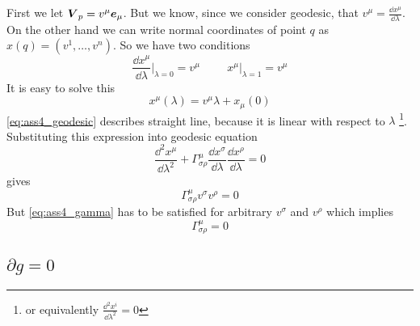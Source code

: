First we let $\boldsymbol{V}_p=v^\mu \boldsymbol{e}_\mu$. But we know, since we consider
geodesic, that $v^\mu = \frac{\dd x^\mu}{\dd \lambda}$.  On the other hand we
can write normal coordinates of point $q$ as $x(q)=(v^1,\dots,v^n)$. So we have
two conditions
%
\begin{equation}
    \frac{\dd x^\mu}{\dd \lambda} \Big|_{\lambda=0} = v^\mu
    \hspace{1cm}
    x^\mu  \Big|_{\lambda=1}= v^\mu
\end{equation}
%
It is easy to solve this
%
\begin{equation}
    x^\mu\left(\lambda\right) = v^\mu \lambda + x_\mu\left(0\right)
    \label{eq:ass4_geodesic}
\end{equation}
%
\autoref{eq:ass4_geodesic} describes straight line, because it is linear with
respect to $\lambda$ \footnote{or equivalently $\frac{\dd^2 x^i}{\dd
            \lambda^2}=0$}.
%
Substituting this expression into geodesic equation
%
\begin{equation}
    \frac{\dd^2 x^\mu}{\dd \lambda^2} +
    \Gamma_{\sigma\rho}^\mu\frac{\dd x^\sigma}{\dd \lambda}\frac{\dd x^\rho}{\dd \lambda} = 0
\end{equation}
%
gives
%
\begin{equation}
    \Gamma_{\sigma\rho}^\mu v^\sigma v^\rho = 0
    \label{eq:ass4_gamma}
\end{equation}
%
But \autoref{eq:ass4_gamma} has to be satisfied for arbitrary $v^\sigma$ and
$v^\rho$ which implies
%
\begin{equation}
    \boxed{\Gamma_{\sigma\rho}^\mu = 0}
\end{equation}
%
\problem

\subsection{\texorpdfstring{$\partial g = 0$}{TEXT}}

